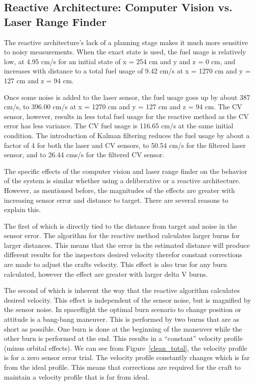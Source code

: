 \documentclass[journal, 10pt]{IEEEtran}
\begin{document}
\subsection{Reactive Architecture: Computer Vision vs. Laser Range Finder}
The reactive architecture's lack of a planning stage makes it much more sensitive to noisy measurements. When the exact state is used, the fuel usage is relatively low, at 4.95 cm/s for an initial state of x = 254 cm and y and z = 0 cm, and increases with distance to a total fuel usage of 9.42 cm/s at x = 1270 cm and y = 127 cm and z = 94 cm. 

Once some noise is added to the laser sensor, the fuel usage goes up by about 387 cm/s, to 396.00 cm/s at x = 1270 cm and y = 127 cm and z = 94 cm. The CV sensor, however, results in less total fuel usage for the reactive method as the CV error has less variance. The CV fuel usage is 116.65 cm/s at the same initial condition. The introduction of Kalman filtering reduces the fuel usage by about a factor of 4 for both the laser and CV sensors, to 50.54 cm/s for the filtered laser sensor, and to 26.44 cms/s for the filtered CV sensor.

The specific effects of the computer vision and laser range finder on the behavior of the system is similar whether using a deliberative or a reactive architecture.  However, as mentioned before, the magnitudes of the effects are greater with increasing sensor error and distance to target.  There are several reasons to explain this.

The first of which is directly tied to the distance from target and noise in the sensor error.  The algorithm for the reactive method calculates larger burns for larger distances.  This means that the error in the estimated distance will produce different results for the inspectors desired velocity therefor constant corrections are made to adjust the crafts velocity.  This effect is also true for any burn calculated, however the effect are greater with larger delta V burns.

The second of which is inherent the way that the reactive algorithm calculates desired velocity.  This effect is independent of the sensor noise, but is magnified by the sensor noise.  In spaceflight the optimal burn scenario to change position or attitude is a bang-bang maneuver.  This is performed by two burns that are as short as possible.  One burn is done at the beginning of the maneuver while the other burn is performed at the end.  This results in a ``constant'' velocity profile (minus orbital effects).  We can see from Figure~\ref{clean_total}, the velocity profile is for a zero sensor error trial.  The velocity profile constantly changes which is far from the ideal profile.  This means that corrections are required for the craft to maintain a velocity profile that is far from ideal.
\end{document}
